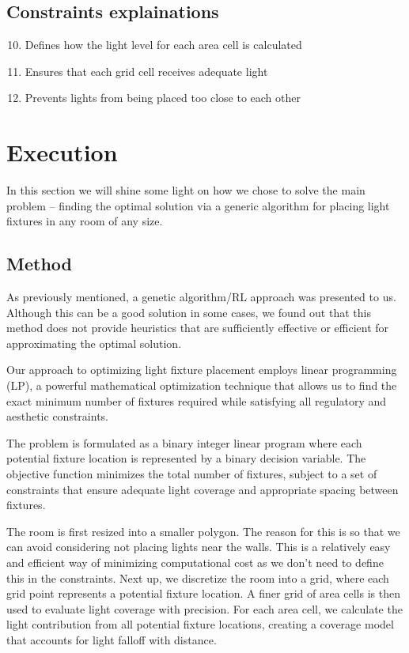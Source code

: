 \documentclass{article}
\begin{document}
\subsection{Constraints explainations}

\begin{enumerate}
    \setcounter{enumi}{9}
    \item Defines how the light level for each area cell is calculated
    \item Ensures that each grid cell receives adequate light
    \item Prevents lights from being placed too close to each other
\end{enumerate}

\newpage

\section{Execution}

In this section we will shine some light on how we chose to solve the main problem – finding the optimal solution via a generic algorithm 
for placing light fixtures in any room of any size.

\subsection{Method}

As previously mentioned, a genetic algorithm/RL approach was presented to us. Although this can be a good solution in some cases, we found out that
this method does not provide heuristics that are sufficiently effective or efficient for approximating the optimal solution.

Our approach to optimizing light fixture placement employs linear programming (LP), a powerful mathematical optimization technique that allows us to 
find the exact minimum number of fixtures required while satisfying all regulatory and aesthetic constraints.

The problem is formulated as a binary integer linear program where each potential fixture location is represented by a binary decision 
variable. The objective function minimizes the total number of fixtures, subject to a set of constraints that ensure adequate light coverage 
and appropriate spacing between fixtures. 

The room is first resized into a smaller polygon. The reason for this is so that we can avoid considering not placing lights near the walls. 
This is a relatively easy and efficient way of minimizing computational cost as we don't need to define this in the constraints. Next up, we 
discretize the room into a grid, where each grid point represents a potential fixture location. A finer grid of area cells is then used to evaluate
light coverage with precision. For each area cell, we calculate the light contribution from all potential fixture locations, creating a coverage
model that accounts for light falloff with distance. 
\end{document}
